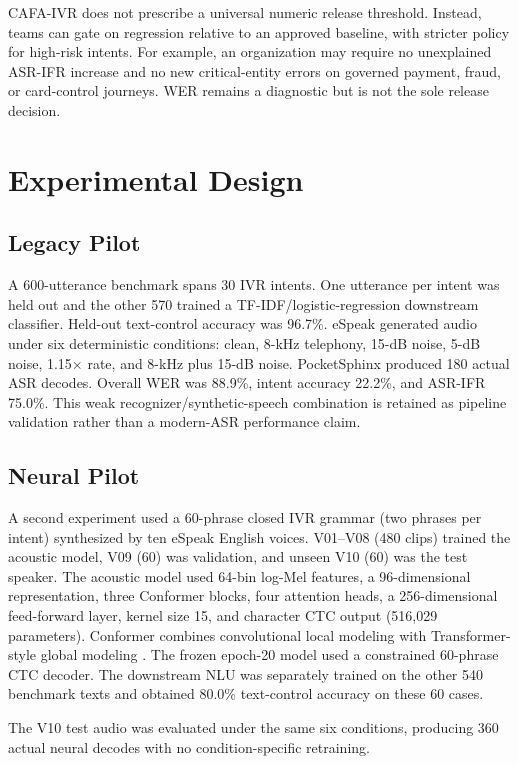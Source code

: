 \documentclass[9pt,twocolumn]{extarticle}
\begin{document}
CAFA-IVR does not prescribe a universal numeric release threshold. Instead, teams can gate on regression relative to an approved baseline, with stricter policy for high-risk intents. For example, an organization may require no unexplained ASR-IFR increase and no new critical-entity errors on governed payment, fraud, or card-control journeys. WER remains a diagnostic but is not the sole release decision.

\section{Experimental Design}
\subsection{Legacy Pilot}
A 600-utterance benchmark spans 30 IVR intents. One utterance per intent was held out and the other 570 trained a TF-IDF/logistic-regression downstream classifier. Held-out text-control accuracy was 96.7\%. eSpeak generated audio under six deterministic conditions: clean, 8-kHz telephony, 15-dB noise, 5-dB noise, 1.15$\times$ rate, and 8-kHz plus 15-dB noise. PocketSphinx produced 180 actual ASR decodes. Overall WER was 88.9\%, intent accuracy 22.2\%, and ASR-IFR 75.0\%. This weak recognizer/synthetic-speech combination is retained as pipeline validation rather than a modern-ASR performance claim.

\subsection{Neural Pilot}
A second experiment used a 60-phrase closed IVR grammar (two phrases per intent) synthesized by ten eSpeak English voices. V01--V08 (480 clips) trained the acoustic model, V09 (60) was validation, and unseen V10 (60) was the test speaker. The acoustic model used 64-bin log-Mel features, a 96-dimensional representation, three Conformer blocks, four attention heads, a 256-dimensional feed-forward layer, kernel size 15, and character CTC output (516,029 parameters). Conformer combines convolutional local modeling with Transformer-style global modeling \cite{gulati2020}. The frozen epoch-20 model used a constrained 60-phrase CTC decoder. The downstream NLU was separately trained on the other 540 benchmark texts and obtained 80.0\% text-control accuracy on these 60 cases.

The V10 test audio was evaluated under the same six conditions, producing 360 actual neural decodes with no condition-specific retraining.
\end{document}
